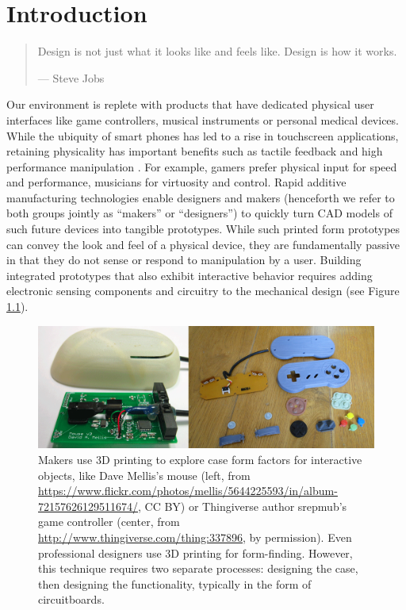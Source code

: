 \chapter{Introduction}

\begin{quote}
Design is not just what it looks like and feels like. Design is how it works.

--- Steve Jobs
\end{quote}

Our environment is replete with products that have dedicated physical user interfaces like game controllers, musical instruments or personal medical devices. While the ubiquity of smart phones has led to a rise in touchscreen applications, retaining physicality has important benefits such as tactile feedback and high performance manipulation \cite{klemmer-bodies}. For example, gamers prefer physical input for speed and performance, musicians for virtuosity and control. Rapid additive manufacturing technologies enable designers and makers (henceforth we refer to both groups jointly as ``makers'' or ``designers'') to quickly turn CAD models of such future devices into tangible prototypes. While such printed form prototypes can convey the look and feel of a physical device, they are fundamentally passive in that they do not sense or respond to manipulation by a user. Building integrated prototypes that also exhibit interactive behavior requires adding electronic sensing components and circuitry to the mechanical design (see Figure \ref{fig:3dcases}).

\begin{figure}
\centering
\includegraphics[width=\textwidth]{figures/3dcases.png}
\caption{Makers use 3D printing to explore case form factors for interactive objects, like Dave Mellis's mouse (left, from \url{https://www.flickr.com/photos/mellis/5644225593/in/album-72157626129511674/}, CC BY) or Thingiverse author srepmub's game controller (center, from \url{http://www.thingiverse.com/thing:337896}, by permission). Even professional designers use 3D printing for form-finding. However, this technique requires two separate processes: designing the case, then designing the functionality, typically in the form of circuitboards.}
\label{fig:3dcases}
\end{figure}

